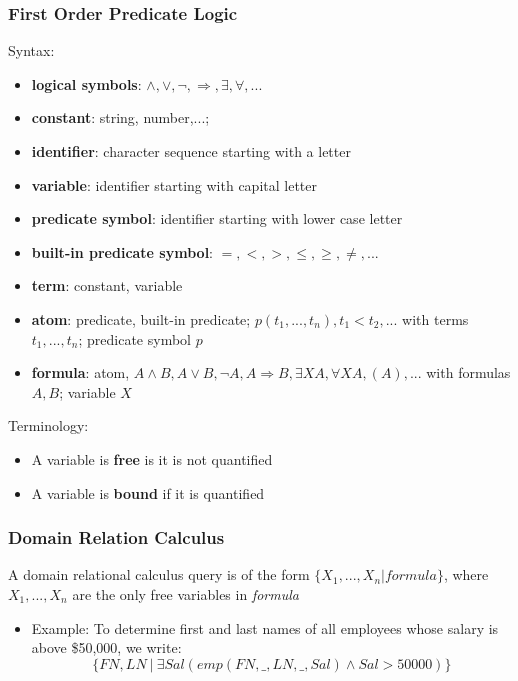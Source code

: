 \subsubsection{First Order Predicate Logic}
Syntax:
\begin{itemize}
    \item \textbf{logical symbols}: $\land, \lor, \lnot, \Rightarrow, \exists, \forall, ...$
    \item \textbf{constant}: string, number,...;
    \item \textbf{identifier}: character sequence starting with a letter
    \item \textbf{variable}: identifier starting with capital letter
    \item \textbf{predicate symbol}: identifier starting with lower case letter
    \item \textbf{built-in predicate symbol}: $=,<,>,\leq,\geq,\neq,...$
    \item \textbf{term}: constant, variable
    \item \textbf{atom}: predicate, built-in predicate; $p(t_1,...,t_n), t_1<t_2,...$ with terms $t_1,...,t_n$; predicate symbol $p$
    \item \textbf{formula}: atom, $A \land B, A \lor B, \lnot A, A \Rightarrow B, \exists XA, \forall XA, (A),... $ with formulas $A, B$; variable $X$
\end{itemize}
Terminology:
\begin{itemize}
    \item A variable is \textbf{free} is it is not quantified
    \item A variable is \textbf{bound} if it is quantified
\end{itemize}

\subsubsection{Domain Relation Calculus}
A domain relational calculus query is of the form $\{X_1,...,X_n | formula \}$, where $X_1,...,X_n$ are the only free variables in \textit{formula}
\begin{itemize}
    \item Example: To determine first and last names of all employees whose salary is above \$50,000, we write: \[
    \{FN, LN \ |\  \exists Sal(emp(FN, \_, LN, \_, Sal) \land Sal >50000) \}
    \]
\end{itemize}